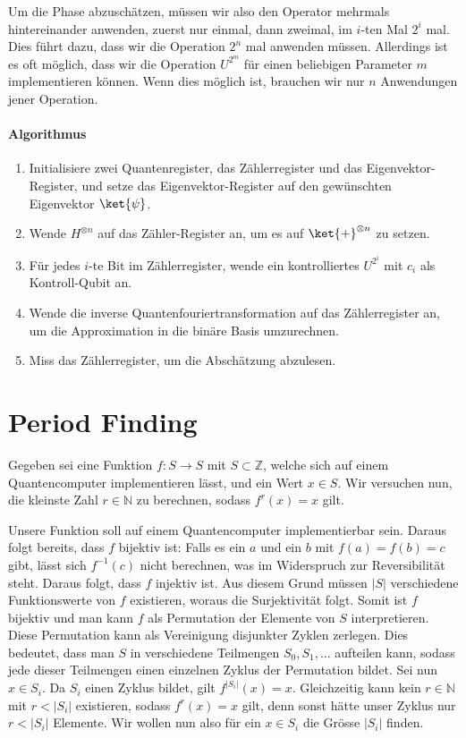 Um die Phase abzuschätzen, müssen wir also den Operator mehrmals hintereinander anwenden, zuerst nur einmal, dann zweimal, im $i$-ten Mal $2^i$ mal. Dies führt dazu, dass wir die Operation $2^n$ mal anwenden müssen. Allerdings ist es oft möglich, dass wir die Operation $U^{2^m}$ für einen beliebigen Parameter $m$ implementieren können. Wenn dies möglich ist, brauchen wir nur $n$ Anwendungen jener Operation.

\paragraph{Algorithmus}
\begin{enumerate}
    \item Initialisiere zwei Quantenregister, das Zählerregister und das Eigenvektor-Register, und setze das Eigenvektor-Register auf den gewünschten Eigenvektor $\ket{\psi}$.
    \item Wende $H^{\otimes n}$ auf das Zähler-Register an, um es auf $\ket{+}^{\otimes n}$ zu setzen.
    \item Für jedes $i$-te Bit im Zählerregister, wende ein kontrolliertes $U^{2^i}$ mit $c_i$ als Kontroll-Qubit an.
    \item Wende die inverse Quantenfouriertransformation auf das Zählerregister an, um die Approximation in die binäre Basis umzurechnen.
    \item Miss das Zählerregister, um die Abschätzung abzulesen.
\end{enumerate}
 \newline

\section{Period Finding}
Gegeben sei eine Funktion $f : S \rightarrow S$ mit $S \subset \mathbb{Z}$, welche sich auf einem Quantencomputer implementieren lässt, und ein Wert $x \in S$. Wir versuchen nun, die kleinste Zahl $r \in \mathbb{N}$ zu berechnen, sodass $f^r(x) = x$ gilt.

Unsere Funktion soll auf einem Quantencomputer implementierbar sein. Daraus folgt bereits, dass $f$ bijektiv ist: Falls es ein $a$ und ein $b$ mit $f(a) = f(b) = c$ gibt, lässt sich $f^{-1}(c)$ nicht berechnen, was im Widerspruch zur Reversibilität steht. Daraus folgt, dass $f$ injektiv ist. Aus diesem Grund müssen $|S|$ verschiedene Funktionswerte von $f$ existieren, woraus die Surjektivität folgt. Somit ist $f$ bijektiv und man kann $f$ als Permutation der Elemente von $S$ interpretieren. Diese Permutation kann als Vereinigung disjunkter Zyklen zerlegen. %
Dies bedeutet, dass man $S$ in verschiedene Teilmengen $S_0, S_1, ...$ aufteilen kann, sodass jede dieser Teilmengen einen einzelnen Zyklus der Permutation bildet.
Sei nun $x \in S_i$. Da $S_i$ einen Zyklus bildet, gilt $f^{|S_i|}(x) = x$. Gleichzeitig kann kein $r \in \mathbb{N}$ mit $r < |S_i|$ existieren, sodass $f^r(x) = x$ gilt, denn sonst hätte unser Zyklus nur $r < |S_i|$ Elemente. Wir wollen nun also für ein $x \in S_i$ die Grösse $|S_i|$ finden.

